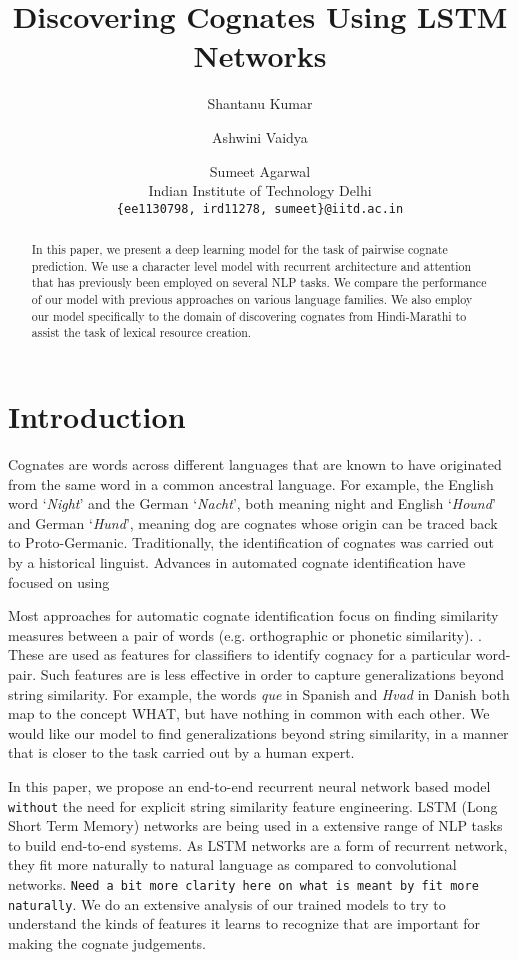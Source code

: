 \documentclass[11pt,letterpaper]{article}
\title{Discovering Cognates Using LSTM Networks}
\author{Shantanu Kumar \and Ashwini Vaidya \and Sumeet Agarwal \\ 
  Indian Institute of Technology Delhi
  \\ {\tt \{ee1130798, ird11278, sumeet\}@iitd.ac.in}}
\date{}
\begin{document}
\maketitle

\begin{abstract}
In this paper, we present a deep learning model for the task of pairwise cognate prediction. We use a character level model with recurrent architecture and attention that has previously been employed on several NLP tasks. We compare the performance of our model with previous approaches on various language families. We also employ our model specifically to the domain of discovering cognates from Hindi-Marathi to assist the task of lexical resource creation.
\end{abstract}

\section{Introduction}
Cognates are words across different languages that are known to have originated from the same word in a common ancestral language. For example, the English word `\textit{Night}' and the German `\textit{Nacht}’, both meaning night and English `\textit{Hound}’ and German `\textit{Hund}’, meaning dog are cognates whose origin can be traced back to Proto-Germanic. Traditionally, the identification of cognates was carried out by a historical linguist. Advances in automated cognate identification have focused on using  

Most approaches for automatic cognate identification focus on finding similarity measures between a pair of words (e.g. orthographic or phonetic similarity). \citep{hauer2011clustering, inkpen2005similarity,List2016g}. These are used as features for classifiers to identify cognacy for a particular word-pair. Such features are is less effective in order to capture generalizations beyond string similarity. For example, the words \textit{que} in Spanish and \textit{Hvad} in Danish both map to the concept \textsc{WHAT}, but have nothing in common with each other. We would like our model to find generalizations beyond string similarity, in a manner that is closer to the task carried out by a human expert. 

In this paper, we propose an end-to-end recurrent neural network based model \texttt{without} the need for explicit string similarity feature engineering. LSTM (Long Short Term Memory) networks are being used in a extensive range of NLP tasks to build end-to-end systems. As LSTM networks are a form of recurrent network, they fit more naturally to natural language as compared to convolutional networks. \texttt{Need a bit more clarity here on what is meant by fit more naturally}. We do an extensive analysis of our trained models to try to understand the kinds of features it learns to recognize that are important for making the cognate judgements.
\end{document}
